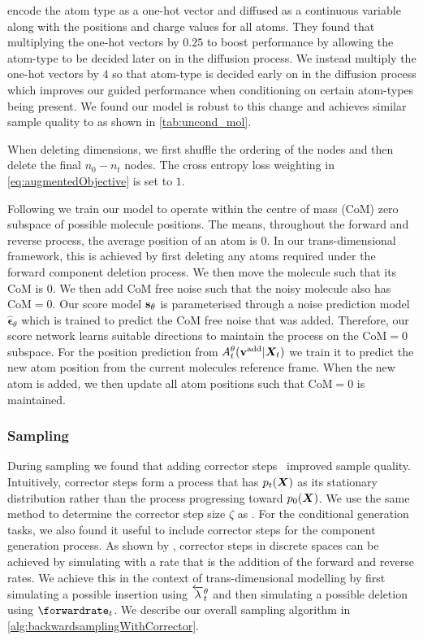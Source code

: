 \citet{hoogeboom2022equivariant} encode the atom type as a one-hot vector and diffused as a continuous variable along with the positions and charge values for all atoms. They found that multiplying the one-hot vectors by $0.25$ to boost performance by allowing the atom-type to be decided later on in the diffusion process. We instead multiply the one-hot vectors by $4$ so that atom-type is decided early on in the diffusion process which improves our guided performance when conditioning on certain atom-types being present. We found our model is robust to this change and achieves similar sample quality to \citet{hoogeboom2022equivariant} as shown in \cref{tab:uncond_mol}.

When deleting dimensions, we first shuffle the ordering of the nodes and then delete the final $n_0 - n_t$ nodes. The cross entropy loss weighting in \cref{eq:augmentedObjective} is set to $1$.

Following \citet{hoogeboom2022equivariant} we train our model to operate within the centre of mass (CoM) zero subspace of possible molecule positions. The means, throughout the forward and reverse process, the average position of an atom is $0$. In our trans-dimensional framework, this is achieved by first deleting any atoms required under the forward component deletion process. We then move the molecule such that its CoM is $0$. We then add CoM free noise such that the noisy molecule also has CoM$=0$. Our score model ${\mathbf{s}}_\theta$ is parameterised through a noise prediction model $\hat{\mathbf{\epsilon}}_\theta$ which is trained to predict the CoM free noise that was added. Therefore, our score network learns suitable directions to maintain the process on the CoM$=0$ subspace. For the position prediction from $A_t^\theta({\mathbf{v}}^{\textup{add}} | {\bm{X}}_t)$ we train it to predict the new atom position from the current molecules reference frame. When the new atom is added, we then update all atom positions such that CoM$=0$ is maintained.

\subsubsection{Sampling}
During sampling we found that adding corrector steps~\citep{song2020score} improved sample quality. Intuitively, corrector steps form a process that has $p_t({\bm{X}})$ as its stationary distribution rather than the process progressing toward $p_0({\bm{X}})$. We use the same method to determine the corrector step size $\zeta$ as \citet{song2020score}. For the conditional generation tasks, we also found it useful to include corrector steps for the component generation process. As shown by \citet{campbell2022continuous}, corrector steps in discrete spaces can be achieved by simulating with a rate that is the addition of the forward and reverse rates. We achieve this in the context of trans-dimensional modelling by first simulating a possible insertion using $\overleftarrow{\lambda}_t^\theta$ and then simulating a possible deletion using $\forwardrate_t$. We describe our overall sampling algorithm in \cref{alg:backwardsamplingWithCorrector}.

